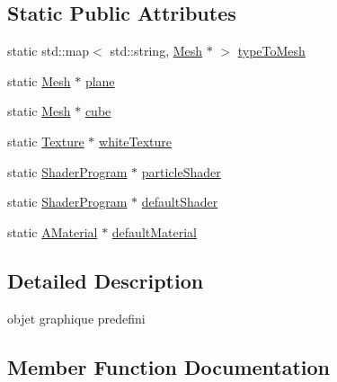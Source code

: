 \subsection*{Static Public Attributes}
\begin{DoxyCompactItemize}
\item 
static std\+::map$<$ std\+::string, \mbox{\hyperlink{class_beer_engine_1_1_graphics_1_1_mesh}{Mesh}} $\ast$ $>$ \mbox{\hyperlink{class_beer_engine_1_1_graphics_1_1_graphics_aa85582550135ddfbdf9a9f01bf037db8}{type\+To\+Mesh}}
\item 
static \mbox{\hyperlink{class_beer_engine_1_1_graphics_1_1_mesh}{Mesh}} $\ast$ \mbox{\hyperlink{class_beer_engine_1_1_graphics_1_1_graphics_a016282a834c725e53a78ad677a4b0e92}{plane}}
\item 
static \mbox{\hyperlink{class_beer_engine_1_1_graphics_1_1_mesh}{Mesh}} $\ast$ \mbox{\hyperlink{class_beer_engine_1_1_graphics_1_1_graphics_a291e41114824803286b61444d51dbbed}{cube}}
\item 
static \mbox{\hyperlink{class_beer_engine_1_1_graphics_1_1_texture}{Texture}} $\ast$ \mbox{\hyperlink{class_beer_engine_1_1_graphics_1_1_graphics_adf77b414d3bba48dfc5c6d73bc2c8379}{white\+Texture}}
\item 
static \mbox{\hyperlink{class_beer_engine_1_1_graphics_1_1_shader_program}{Shader\+Program}} $\ast$ \mbox{\hyperlink{class_beer_engine_1_1_graphics_1_1_graphics_acf24282d07f1550565efe2e70267d0b9}{particle\+Shader}}
\item 
static \mbox{\hyperlink{class_beer_engine_1_1_graphics_1_1_shader_program}{Shader\+Program}} $\ast$ \mbox{\hyperlink{class_beer_engine_1_1_graphics_1_1_graphics_a2d9a8586cdd37aa90b847648c98bc2bb}{default\+Shader}}
\item 
static \mbox{\hyperlink{class_beer_engine_1_1_graphics_1_1_a_material}{A\+Material}} $\ast$ \mbox{\hyperlink{class_beer_engine_1_1_graphics_1_1_graphics_add3cee4b8390ccdf3df6810ac5fbe5a2}{default\+Material}}
\end{DoxyCompactItemize}


\subsection{Detailed Description}
objet graphique predefini 

\subsection{Member Function Documentation}
\mbox{\label{class_beer_engine_1_1_graphics_1_1_graphics_a87ad2f3a98b4fa5fd453589f7f023701}} 
